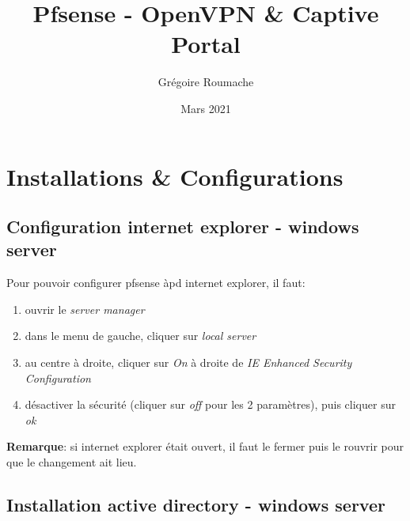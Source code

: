 \documentclass[a4paper]{article}
\title{Pfsense - OpenVPN \& Captive Portal}
\author{Grégoire Roumache}
\date{Mars 2021}
\begin{document}
\maketitle















\section{Installations \& Configurations}










\subsection{Configuration internet explorer - windows server}





Pour pouvoir configurer pfsense àpd internet explorer, il faut:
\begin{enumerate}
    \item ouvrir le \textit{server manager}
    \item dans le menu de gauche, cliquer sur \textit{local server}
    \item au centre à droite, cliquer sur \textit{On} à droite de \textit{IE Enhanced Security Configuration}
    \item désactiver la sécurité (cliquer sur \textit{off} pour les 2 paramètres), puis cliquer sur \textit{ok}
\end{enumerate}
\textbf{Remarque}: si internet explorer était ouvert, il faut le fermer puis le rouvrir pour que le changement ait lieu.










\subsection{Installation active directory - windows server}
\end{document}
